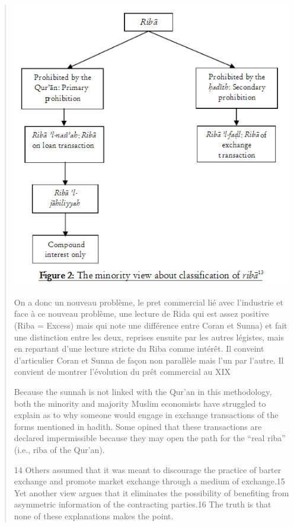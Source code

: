 \begin{quote}
\includegraphics[width=\textwidth]{CourantsIslamContemporain/ImagesCourantsIslamContemporain/RibaMajority.png}
\begin{Synthesis}
On a donc un nouveau problème, le pret commercial lié avec l'industrie et face à ce nouveau problème, une lecture de Rida qui est assez positive (Riba = Excess) mais qui note une différence entre Coran et Sunna) et fait une distinction entre les deux, reprises ensuite par les autres légistes, mais en repartant d'une lecture stricte du Riba comme intérêt. Il conveint d'articulier Coran et Sunna de façon non parallèle mais l'un par l'autre.
Il convient de montrer l'évolution du prêt commercial au XIX
\end{Synthesis}
Because the sunnah is not linked with the Qur'an in this methodology, both the minority and majority Muslim economists have struggled to explain as to why someone would engage in exchange transactions of the forms mentioned in hadith. Some opined that these transactions are declared impermissible because they may open the path for the “real riba” (i.e., riba of the Qur'an).


14 Others assumed that it was meant to discourage the practice of barter exchange and promote market exchange through a medium of exchange.15 Yet another view argues that it eliminates the possibility of benefiting from asymmetric information of the contracting parties.16 The truth is that none of these explanations makes the point.


\end{quote}
